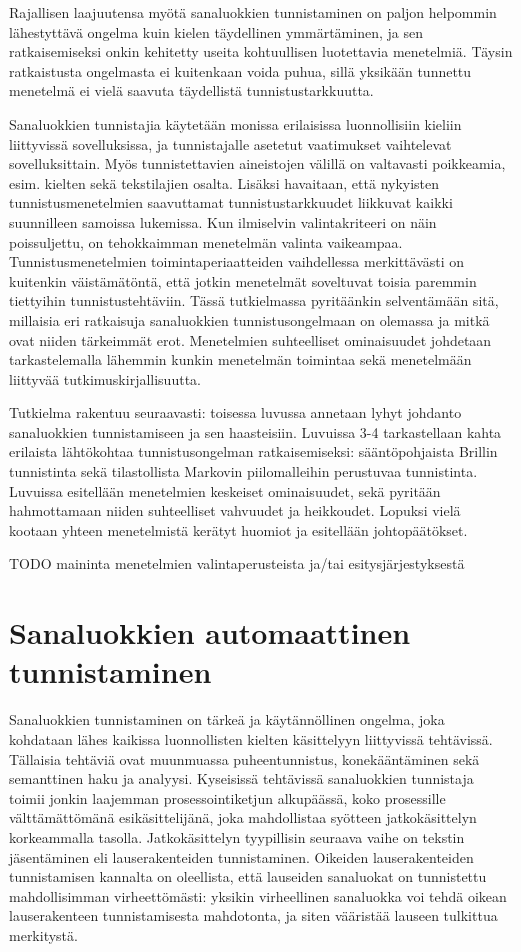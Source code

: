 \documentclass[utf8,bachelor,manualbib]{gradu3}
\begin{document}
Rajallisen laajuutensa myötä sanaluokkien tunnistaminen on paljon helpommin lähestyttävä ongelma kuin kielen täydellinen ymmärtäminen, ja sen ratkaisemiseksi onkin kehitetty useita kohtuullisen luotettavia menetelmiä. Täysin ratkaistusta ongelmasta ei kuitenkaan voida puhua, sillä yksikään tunnettu menetelmä ei vielä saavuta täydellistä tunnistustarkkuutta. \citep[s. 342]{manning1999}

Sanaluokkien tunnistajia käytetään monissa erilaisissa luonnollisiin kieliin liittyvissä sovelluksissa, ja tunnistajalle asetetut vaatimukset vaihtelevat sovelluksittain. Myös tunnistettavien aineistojen välillä on valtavasti poikkeamia, esim. kielten sekä tekstilajien osalta. Lisäksi havaitaan, että nykyisten tunnistusmenetelmien saavuttamat tunnistustarkkuudet liikkuvat kaikki suunnilleen samoissa lukemissa. Kun ilmiselvin valintakriteeri on näin poissuljettu, on tehokkaimman menetelmän valinta vaikeampaa. Tunnistusmenetelmien toimintaperiaatteiden vaihdellessa merkittävästi on kuitenkin väistämätöntä, että jotkin menetelmät soveltuvat toisia paremmin tiettyihin tunnistustehtäviin. Tässä tutkielmassa pyritäänkin selventämään sitä, millaisia eri ratkaisuja sanaluokkien tunnistusongelmaan on olemassa ja mitkä ovat niiden tärkeimmät erot. Menetelmien suhteelliset ominaisuudet johdetaan tarkastelemalla lähemmin kunkin menetelmän toimintaa sekä menetelmään liittyvää tutkimuskirjallisuutta. 

Tutkielma rakentuu seuraavasti: toisessa luvussa annetaan lyhyt johdanto sanaluokkien tunnistamiseen ja sen haasteisiin. Luvuissa 3-4 tarkastellaan kahta erilaista lähtökohtaa tunnistusongelman ratkaisemiseksi: sääntöpohjaista Brillin tunnistinta sekä tilastollista Markovin piilomalleihin perustuvaa tunnistinta. Luvuissa esitellään menetelmien keskeiset ominaisuudet, sekä pyritään hahmottamaan niiden suhteelliset vahvuudet ja heikkoudet. Lopuksi vielä kootaan yhteen menetelmistä kerätyt huomiot ja esitellään johtopäätökset.

TODO maininta menetelmien valintaperusteista ja/tai esitysjärjestyksestä


\chapter{Sanaluokkien automaattinen tunnistaminen}

Sanaluokkien tunnistaminen on tärkeä ja käytännöllinen ongelma, joka kohdataan lähes kaikissa luonnollisten kielten käsittelyyn liittyvissä tehtävissä. Tällaisia tehtäviä ovat muunmuassa puheentunnistus, konekääntäminen sekä semanttinen haku ja analyysi. Kyseisissä tehtävissä sanaluokkien tunnistaja toimii jonkin laajemman prosessointiketjun alkupäässä, koko prosessille välttämättömänä esikäsittelijänä, joka mahdollistaa syötteen jatkokäsittelyn korkeammalla tasolla. Jatkokäsittelyn tyypillisin seuraava vaihe on tekstin jäsentäminen eli lauserakenteiden tunnistaminen. Oikeiden lauserakenteiden tunnistamisen kannalta on oleellista, että lauseiden sanaluokat on tunnistettu mahdollisimman virheettömästi: yksikin virheellinen sanaluokka voi tehdä oikean lauserakenteen tunnistamisesta mahdotonta, ja siten vääristää lauseen tulkittua merkitystä.
\end{document}
